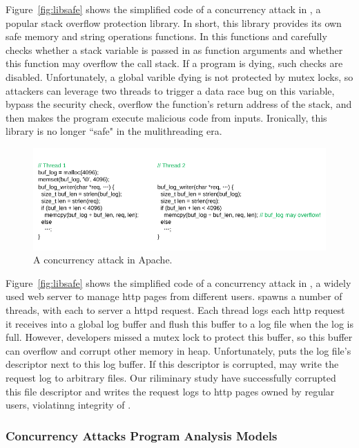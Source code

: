 Figure~\ref{fig:libsafe} shows the simplified code of a concurrency attack in 
\libsafe, a popular stack overflow protection library. In short, this library 
provides its own safe memory and string operations functions. In this 
functions and carefully checks whether a stack variable is passed in as 
function arguments and whether this function may overflow the call stack. If a 
program is dying, such checks are disabled. Unfortunately, a global varible 
\v{dying} is not protected by mutex locks, so attackers can leverage two 
threads to trigger a data race bug on this variable, bypass the security 
check, overflow the function's return address of the stack, and then makes the 
program execute malicious code from inputs. Ironically, this \libsafe library 
is no longer ``safe" in the mulithreading era.

\begin{figure}[t]
\centering
\includegraphics[width=0.99\columnwidth]{figures/apache}
\vspace{-.05in}
\caption{{A concurrency attack in Apache.}} \label{fig:apache}
\vspace{-.05in}
\end{figure}

Figure~\ref{fig:libsafe} shows the simplified code of a concurrency attack in 
\apache, a widely used web server to manage http pages from different users. 
\apache spawns a number of threads, with each to server a httpd request. Each 
thread logs each http request it receives into a global log buffer and flush 
this buffer to a log file when the log is full. However, developers missed a 
mutex lock to protect this buffer, so this buffer can overflow and corrupt 
other memory in heap. Unfortunately, \apache puts the log file's descriptor next 
to this log buffer. If this descriptor is corrupted, \apache may write the 
request log to arbitrary files. Our riliminary study have successfully corrupted 
this file descriptor and writes the request logs to http pages owned by regular 
users, violatinng integrity of \apache.

\subsubsection{Concurrency Attacks Program Analysis Models} 
\label{sec:attack-phase}


